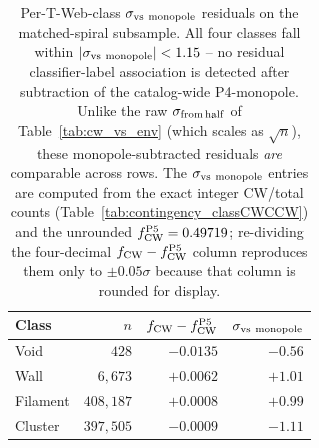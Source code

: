 \documentclass[twocolumn,linenumbers]{aastex702}
\begin{document}
\begin{table}[ht]
\caption{Per-T-Web-class $\sigma_{\rm vs\ monopole}$ residuals on the
matched-spiral subsample. All four classes fall within
$|\sigma_{\rm vs\ monopole}| < 1.15$ -- no residual classifier-label
association is detected after subtraction of the catalog-wide P4-monopole. Unlike the raw
$\sigma_{\rm from\,half}$ of Table~\ref{tab:cw_vs_env} (which scales
as $\sqrt{n}$), these monopole-subtracted residuals \emph{are}
comparable across rows. The $\sigma_{\rm vs\ monopole}$ entries are
computed from the exact integer CW/total counts
(Table~\ref{tab:contingency_classCWCCW}) and the unrounded
$f_{\rm CW}^{\rm P5} = 0.49719$; re-dividing the four-decimal
$f_{\rm CW} - f_{\rm CW}^{\rm P5}$ column reproduces them only to
$\pm 0.05\sigma$ because that column is rounded for display.}
\label{tab:p4_monopole_residual}
\begin{ruledtabular}
\begin{tabular}{lrrr}
Class & $n$ & $f_{\rm CW} - f_{\rm CW}^{\rm P5}$ &
$\sigma_{\rm vs\ monopole}$ \\
\hline
Void     & $428$     & $-0.0135$ & $-0.56$ \\
Wall     & $6{,}673$ & $+0.0062$ & $+1.01$ \\
Filament & $408{,}187$ & $+0.0008$ & $+0.99$ \\
Cluster  & $397{,}505$ & $-0.0009$ & $-1.11$ \\
\end{tabular}
\end{ruledtabular}
\end{table}
\end{document}
